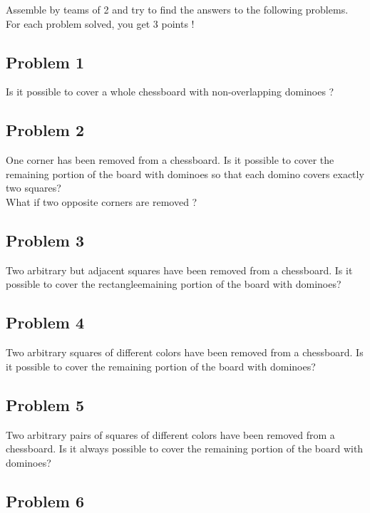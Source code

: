 \documentclass[12pt,a4paper,article,english,firamath]{nsi}
\begin{document}
\maketitle
Assemble by teams of 2 and try to find the answers to the following problems.\\ For each problem solved, you get 3 points !

\subsection*{Problem 1}

Is it possible to cover a whole chessboard with non-overlapping dominoes ? 

\subsection*{Problem 2}

One corner has been removed from a chessboard. Is it possible to cover the remaining portion of the board with dominoes so that each domino covers exactly two squares?\\
What if two opposite corners are removed ?

\subsection*{Problem 3}

Two arbitrary but adjacent squares have been removed from a chessboard. Is it possible to cover the rectangleemaining portion of the board with dominoes?

\subsection*{Problem 4}

Two arbitrary squares of different colors have been removed from a chessboard. Is it possible to cover the remaining portion of the board with dominoes?

\subsection*{Problem 5}

Two arbitrary pairs of squares of different colors have been removed from a chessboard. Is it always possible to cover the remaining portion of the board with dominoes?

\subsection*{Problem 6}
\end{document}
